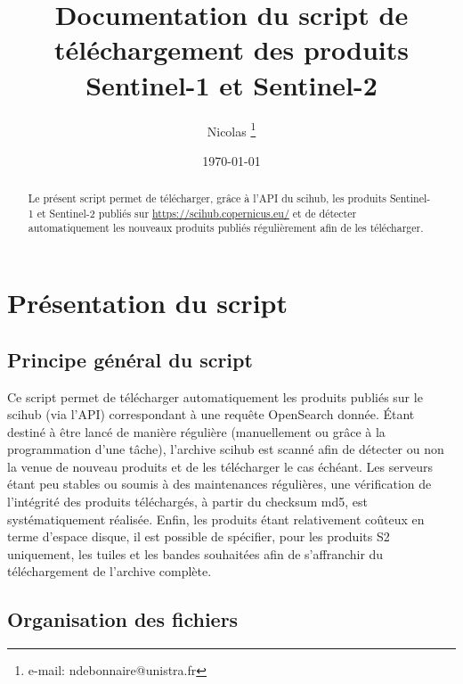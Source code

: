 \documentclass[notitlepage]{report}
\title{Documentation du script de téléchargement des produits Sentinel-1 et Sentinel-2}
\author{Nicolas \bsc{Débonnaire}\footnote{e-mail: ndebonnaire@unistra.fr}}
\date{\today}
\makeatletter
\newcommand*{\toccontents}{\@starttoc{toc}}
\makeatother
\begin{document}
\maketitle
\begin{abstract}
Le présent script permet de télécharger, grâce à l'API du scihub, les produits Sentinel-1 et Sentinel-2 publiés sur \url{https://scihub.copernicus.eu/} et de détecter automatiquement les nouveaux produits publiés régulièrement afin de les télécharger.
\end{abstract}

\toccontents


\section{Présentation du script}
\subsection{Principe général du script}
Ce script permet de télécharger automatiquement les produits publiés sur le scihub (via l'API) correspondant à une requête OpenSearch donnée. Étant destiné à être lancé de manière régulière (manuellement ou grâce à la programmation d'une tâche), l'archive scihub est scanné afin de détecter ou non la venue de nouveau produits et de les télécharger le cas échéant. Les serveurs étant peu stables ou soumis à des maintenances régulières, une vérification de l'intégrité des produits téléchargés, à partir du checksum md5, est systématiquement réalisée. Enfin, les produits étant relativement coûteux en terme d’espace disque, il est possible de spécifier, pour les produits S2 uniquement, les tuiles et les bandes souhaitées afin de s'affranchir du téléchargement de l'archive complète.

\subsection{Organisation des fichiers}
\end{document}
